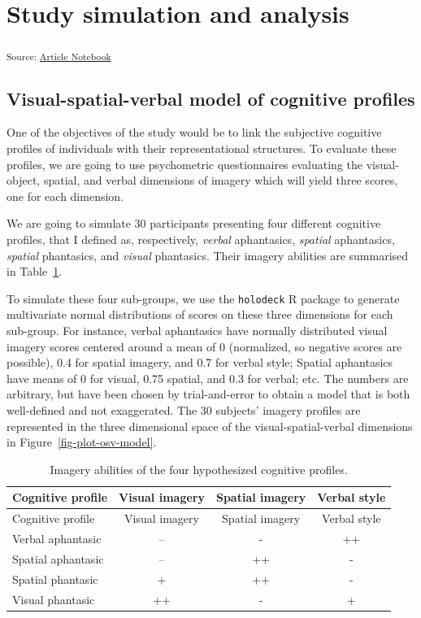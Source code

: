 \documentclass[
  authoryear]{elsarticle}
\begin{document}
\section{Study simulation and
analysis}\label{study-simulation-and-analysis}

\textsubscript{Source:
\href{https://m-delem.github.io/2499-similarity-manuscript/index.qmd.html}{Article
Notebook}}

\subsection{Visual-spatial-verbal model of cognitive
profiles}\label{visual-spatial-verbal-model-of-cognitive-profiles}

One of the objectives of the study would be to link the subjective
cognitive profiles of individuals with their representational
structures. To evaluate these profiles, we are going to use psychometric
questionnaires evaluating the visual-object, spatial, and verbal
dimensions of imagery which will yield three scores, one for each
dimension.

We are going to simulate 30 participants presenting four different
cognitive profiles, that I defined as, respectively, \emph{verbal}
aphantasics, \emph{spatial} aphantasics, \emph{spatial} phantasics, and
\emph{visual} phantasics. Their imagery abilities are summarised in
Table~\ref{tbl-imageries}.

To simulate these four sub-groups, we use the \texttt{holodeck} R
package to generate multivariate normal distributions of scores on these
three dimensions for each sub-group. For instance, verbal aphantasics
have normally distributed visual imagery scores centered around a mean
of 0 (normalized, so negative scores are possible), 0.4 for spatial
imagery, and 0.7 for verbal style; Spatial aphantasics have means of 0
for visual, 0.75 spatial, and 0.3 for verbal; etc. The numbers are
arbitrary, but have been chosen by trial-and-error to obtain a model
that is both well-defined and not exaggerated. The 30 subjects' imagery
profiles are represented in the three dimensional space of the
visual-spatial-verbal dimensions in Figure~\ref{fig-plot-osv-model}.

\begin{longtable}[]{@{}lccc@{}}
\caption{Imagery abilities of the four hypothesized cognitive
profiles.}\label{tbl-imageries}\tabularnewline
\toprule\noalign{}
Cognitive profile & Visual imagery & Spatial imagery & Verbal style \\
\midrule\noalign{}
\endfirsthead
\toprule\noalign{}
Cognitive profile & Visual imagery & Spatial imagery & Verbal style \\
\midrule\noalign{}
\endhead
\bottomrule\noalign{}
\endlastfoot
Verbal aphantasic & -- & - & ++ \\
Spatial aphantasic & -- & ++ & - \\
Spatial phantasic & + & ++ & - \\
Visual phantasic & ++ & - & + \\
\end{longtable}
\end{document}
